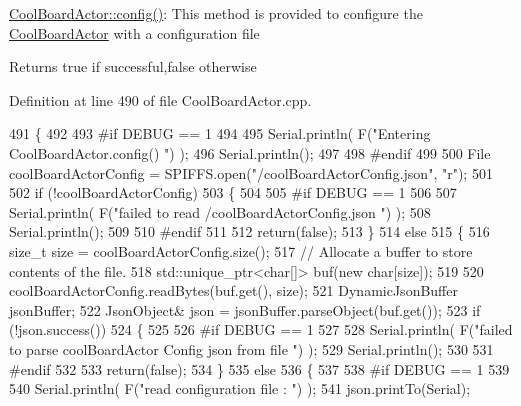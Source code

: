 \hyperlink{class_cool_board_actor_a5af5538fc7d169f63127e06d5219bcd4}{Cool\+Board\+Actor\+::config()}\+: This method is provided to configure the \hyperlink{class_cool_board_actor}{Cool\+Board\+Actor} with a configuration file

\begin{DoxyReturn}{Returns}
true if successful,false otherwise 
\end{DoxyReturn}


Definition at line 490 of file Cool\+Board\+Actor.\+cpp.


\begin{DoxyCode}
491 \{
492 
493 \textcolor{preprocessor}{#if DEBUG == 1 }
494 
495     Serial.println( F(\textcolor{stringliteral}{"Entering CoolBoardActor.config() "}) );
496     Serial.println();
497 
498 \textcolor{preprocessor}{#endif}
499 
500     File coolBoardActorConfig = SPIFFS.open(\textcolor{stringliteral}{"/coolBoardActorConfig.json"}, \textcolor{stringliteral}{"r"});
501 
502     \textcolor{keywordflow}{if} (!coolBoardActorConfig) 
503     \{
504 
505 \textcolor{preprocessor}{    #if DEBUG == 1 }
506 
507         Serial.println( F(\textcolor{stringliteral}{"failed to read /coolBoardActorConfig.json "}) );
508         Serial.println();
509 
510 \textcolor{preprocessor}{    #endif}
511 
512         \textcolor{keywordflow}{return}(\textcolor{keyword}{false});
513     \}
514     \textcolor{keywordflow}{else}
515     \{
516         \textcolor{keywordtype}{size\_t} size = coolBoardActorConfig.size();
517         \textcolor{comment}{// Allocate a buffer to store contents of the file.}
518         std::unique\_ptr<char[]> buf(\textcolor{keyword}{new} \textcolor{keywordtype}{char}[size]);
519 
520         coolBoardActorConfig.readBytes(buf.get(), size);
521         DynamicJsonBuffer jsonBuffer;
522         JsonObject& json = jsonBuffer.parseObject(buf.get());
523         \textcolor{keywordflow}{if} (!json.success()) 
524         \{
525         
526 \textcolor{preprocessor}{        #if DEBUG == 1 }
527 
528             Serial.println( F(\textcolor{stringliteral}{"failed to parse coolBoardActor Config  json from file "}) );
529             Serial.println();
530 
531 \textcolor{preprocessor}{        #endif}
532 
533             \textcolor{keywordflow}{return}(\textcolor{keyword}{false});
534         \} 
535         \textcolor{keywordflow}{else}
536         \{ 
537         
538 \textcolor{preprocessor}{        #if DEBUG == 1 }
539 
540             Serial.println( F(\textcolor{stringliteral}{"read configuration file : "}) );
541             json.printTo(Serial);

\end{DoxyCode}

